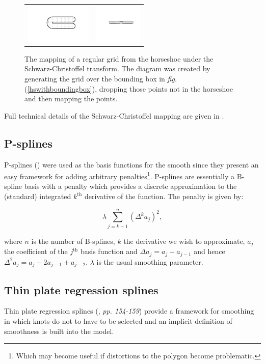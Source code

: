 \documentclass[a4paper,10pt]{amsart}
\newcommand{\sch}{Schwarz-Christoffel }
\newcommand{\fig}[1]{\emph{fig.} (\ref{#1})}
\begin{document}
\begin{figure}
\centering
\begin{tabular}{cc}
\includegraphics[height=0.75in, trim=1in 1in 0in 0.75in]{figs/hsgridmapping-1} & \includegraphics[height=0.75in, trim=1in 1in 0in 0.75in]{figs/hsgridmapping-2} \\
\end{tabular}
\caption{The mapping of a regular grid from the horseshoe under the \sch transform. The diagram was created by generating the grid over the bounding box in \fig{hswithboundingbox}, dropping those points not in the horseshoe and then mapping the points.}
\label{hsgridmapping}
\end{figure}

Full technical details of the \sch mapping are given in \cite{miller08}.


\subsection{P-splines}
P-splines (\cite{eilersmarx96}) were used as the basis functions for the smooth since they present an easy framework for adding arbitrary penalties\footnote{Which may become useful if distortions to the polygon become problematic.}. P-splines are essentially a B-spline basis with a penalty which provides a discrete approximation to the (standard) integrated $k^\text{th}$ derivative of the function. The penalty is given by:

\begin{equation*}
\lambda \sum_{j=k+1}^n (\Delta^k a_j)^2,
\end{equation*}

where $n$ is the number of B-splines, $k$ the derivative we wish to approximate, $a_j$ the coefficient of the $j^\text{th}$ basis function and $\Delta a_j = a_j-a_{j-1}$ and hence $\Delta^2 a_j = a_j-2a_{j-1}+a_{j-2}$. $\lambda$ is the usual smoothing parameter. 

\subsection{Thin plate regression splines}
Thin plate regression splines (\cite{simonbook}, \emph{pp. 154-159}) provide a framework for smoothing in which knots do not to have to be selected and an implicit definition of smoothness is built into the model.
\end{document}
